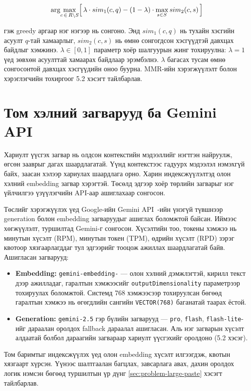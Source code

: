 \documentclass[../main.tex]{subfiles}
\begin{document}
\[
\arg\!\max_{c \,\in\, R \setminus S}
\Bigl[\, \lambda \cdot sim_1(c, q)
  - (1 - \lambda) \cdot \max_{s \in S} sim_2(c, s) \,\Bigr]
\]

гэж greedy аргаар нэг нэгээр нь сонгоно. Энд $sim_1(c,q)$ нь тухайн хэсгийн
асуулт $q$-тай хамаарлыг, $sim_2(c,s)$ нь өмнө сонгогдсон хэсгүүдтэй давхцах
байдлыг хэмжинэ. $\lambda \in [0,1]$ параметр хоёр шалгуурын жинг тохируулна:
$\lambda = 1$ үед зөвхөн асуулттай хамаарах байдлаар эрэмбэлнэ.
$\lambda$ багасах тусам өмнө сонгосонтой давхцах хэсгүүдийн оноо буурна.
MMR-ийн хэрэгжүүлэлт болон хэрэглэгчийн тохиргоог 5.2 хэсэгт тайлбарлав.

\section{Том хэлний загварууд ба Gemini API}

Хариулт үүсгэх загвар нь олдсон контекстийн мэдээллийг нэгтгэн найруулж,
өгсөн зааврыг дагах шаардлагатай. Үүнд контекстээс гадуурх мэдээлэл
нэмэхгүй байх, заасан хэлээр хариулах шаардлага орно. Харин индексжүүлэлтэд
олон хэлний embedding загвар хэрэгтэй. Төсөлд эдгээр хоёр төрлийн
загварыг нэг үйлчилгээ үзүүлэгчийн API-аар ашиглахаар сонгосон.

Төслийг хэрэгжүүлэх үед Google-ийн Gemini API~\cite{geminiapi}-ийн
үнэгүй түвшнээр generation болон embedding загваруудыг ашиглах боломжтой
байсан. Иймээс хөгжүүлэлт, туршилтад Gemini-г сонгосон. Хүсэлтийн тоо,
токены хэмжээ нь минутын хүсэлт (RPM), минутын токен (TPM), өдрийн хүсэлт
(RPD) зэрэг квотоор хязгаарлагддаг тул эдгээрийг тооцож ажиллах шаардлагатай
байв. Ашигласан загварууд:

\begin{itemize}
\item \textbf{Embedding:} \texttt{gemini-\allowbreak embedding-} --- олон хэлний
дэмжлэгтэй, кирилл текст дээр ажилладаг, гаралтын хэмжээсийг
\texttt{outputDimensionality} параметрээр тохируулах боломжтой. Системд 768
хэмжээсээр тохируулсан бөгөөд гаралтын хэмжээ нь өгөгдлийн сангийн
\texttt{VECTOR(768)} баганатай таарах ёстой.
\item \textbf{Generation:} \texttt{gemini-2.5} гэр бүлийн загварууд ---
\texttt{pro}, \texttt{flash}, \texttt{flash-lite}-ийг дараалан оролдох
fallback дараалал ашигласан. Аль нэг загварын хүсэлт алдаатай болбол
дараагийн загвараар хариулт үүсгэхийг оролдоно (5.2 хэсэг).
\end{itemize}

Том баримтыг индексжүүлэх үед олон embedding хүсэлт илгээгдэж, квотын
хязгаарт хүрсэн. Үүнээс шалтгаалан багцлах, завсарлага авах, дахин оролдох
логик нэмсэн бөгөөд туршилтын үр дүнг \ref{sec:problem-large-paste}
хэсэгт тайлбарлав.
\end{document}
